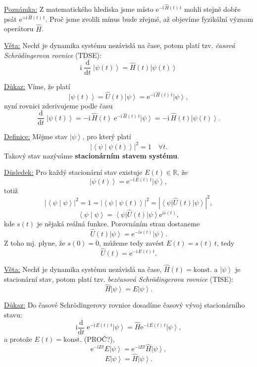 \documentclass[10pt,a4paper]{article}
\newcommand{\const}[1]{\text{#1}}
\newcommand{\abs}[1]{\left| #1 \right|}
\newcommand{\dd}[2]{\frac{\const{d} #1}{\const{d} #2} \;}
\newcommand{\bra}[1]{\left< #1 \right|}
\newcommand{\ket}[1]{\left| #1 \right>}
\newcommand{\braket}[2]{\left< #1 \middle| #2 \right>}
\newcommand{\e}[1]{\const{e}^{#1}}
\renewcommand{\i}{\const{i}}
\def\R{\mathbb{R}}
\def\konst{\mathrm{konst.}}
\begin{document}
\vspace{2em}
\underline{Poznámka:}
Z matematického hlediska jsme místo $\e{-\i \, \hat{H}(t) \, t}$ mohli stejně dobře psát $\e{+\i \, \hat{H}(t) \, t}$. Proč jsme zvolili mínus bude zřejmé, až objevíme fyzikální význam operátoru $\hat{H}$.

\vspace{2em}
\underline{Věta:}
Nechť je dynamika systému nezávislá na čase, potom platí tzv. \textit{časová Schrödingerova rovnice} (TDSE):
$$ \i \; \dd{}{t} \! \ket{\psi(t)} = \hat{H}(t) \ket{\psi(t)} $$

\underline{Důkaz:}
Víme, že platí $$\ket{\psi(t)} = \hat{U}(t) \ket{\psi} = \e{-\i \, \hat{H}(t) \, t} \ket{\psi},$$ nyní rovnici zderivujeme podle času $$\dd{}{t} \ket{\psi(t)} = -\i \, \hat{H}(t) \; \e{-\i \, \hat{H}(t) \, t} \ket{\psi} = -\i \, \hat{H}(t) \ket{\psi(t)}.$$

\vspace{2em}
\underline{Definice:}
Mějme stav $\ket{\psi}$, pro který platí $$\abs{\braket{\psi}{\psi(t)}}^2 = 1 \quad \forall t.$$ Takový stav nazýváme \textbf{stacionárním stavem systému}.

\vspace{2em}
\underline{Důsledek:}
Pro každý stacionární stav existuje $E(t) \in \R$, že $$\ket{\psi(t)} = \e{-\i \, E(t) \, t} \ket{\psi},$$ totiž $$\abs{\braket{\psi}{\psi}}^2 = 1 = \abs{\braket{\psi}{\psi(t)}}^2 = \abs{\bra{\psi} \hat{U}(t) \ket{\psi}}^2,$$ $$\braket{\psi}{\psi} = \bra{\psi} \hat{U}(t) \ket{\psi} \e{\i s(t)},$$
kde $s(t)$ je nějaká reálná funkce. Porovnáním stran dostaneme $$\hat{U}(t) \ket{\psi} = \e{-\i s(t)} \ket{\psi}.$$ Z toho mj. plyne, že $s(0)=0$, můžeme tedy zavést $E(t) = s(t) \, t$, tedy $$\hat{U}(t) = \e{-\i \, E(t) \, t}.$$

\vspace{2em}
\underline{Věta:}
Nechť je dynamika systému nezávislá na čase, $\hat{H}(t) = \konst$ a $\ket{\psi}$ je stacionární stav, potom platí tzv. \textit{bezčasová Schrödingerova rovnice} (TISE): $$\hat{H} \ket{\psi} = E \ket{\psi}.$$

\underline{Důkaz:}
Do časové Schrödingerovy rovnice dosadíme časový vývoj stacionárního stavu: $$\i \dd{}{t} \e{-\i \, E(t) \, t} \ket{\psi} = \hat{H} \e{-\i \, E(t) \, t} \ket{\psi},$$ a protože $E(t) = \konst$ (PROČ?), $$\e{-\i E t} E \ket{\psi} = \e{-\i E t} \hat{H} \ket{\psi},$$ $$E \ket{\psi} = \hat{H} \ket{\psi}.$$
\end{document}
